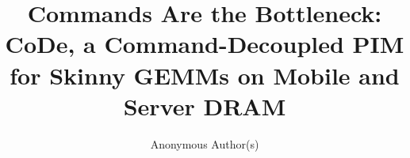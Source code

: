 \documentclass[sigconf, screen, review, anonymous, nonacm]{acmart}
\begin{document}
\title{Commands Are the Bottleneck: CoDe, a Command-Decoupled PIM for Skinny GEMMs on Mobile and Server DRAM}
\author{Anonymous Author(s)}



\maketitle












\end{document}
